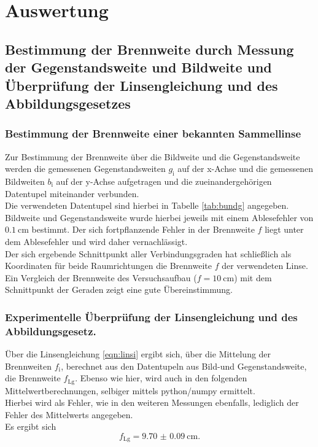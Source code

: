 \section{Auswertung}
\label{sec:Auswertung}

\subsection{Bestimmung der Brennweite durch Messung der Gegenstandsweite und Bildweite und Überprüfung der Linsengleichung und des Abbildungsgesetzes}

\subsubsection{Bestimmung der Brennweite einer bekannten Sammellinse}
\label{sec:zuvor}
Zur Bestimmung der Brennweite über die Bildweite und die Gegenstandsweite werden die gemessenen Gegenstandsweiten $g_{\mathrm{i}}$ auf der x-Achse und die gemessenen Bildweiten $b_{\mathrm{i}}$ auf der y-Achse aufgetragen und die zueinandergehörigen Datentupel miteinander verbunden. \\
Die verwendeten Datentupel sind hierbei in Tabelle \ref{tab:bundg} angegeben.
Bildweite und Gegenstandsweite wurde hierbei jeweils mit einem Ablesefehler von $\SI{0.1}{\centi\meter}$ bestimmt. Der sich fortpflanzende Fehler in der Brennweite $f$ liegt unter dem Ablesefehler und wird daher vernachlässigt.
\\Der sich ergebende Schnittpunkt aller Verbindungsgraden hat schließlich als Koordinaten für beide Raumrichtungen die Brennweite $f$ der verwendeten Linse.
Ein Vergleich der Brennweite des Versuchsaufbau ($f=\SI{10}{\centi\meter}$) mit dem Schnittpunkt der Geraden zeigt eine gute Übereinstimmung.

\subsubsection{Experimentelle Überprüfung der Linsengleichung und des Abbildungsgesetz.}
Über die Linsengleichung \eqref{eqn:linsi} ergibt sich, über die Mittelung der Brennweiten $f_{\mathrm{i}}$, berechnet aus den Datentupeln aus Bild-und Gegenstandsweite, die Brennweite $f_{\mathrm{Lg}}$.
Ebenso wie hier, wird auch in den folgenden Mittelwertberechnungen, selbiger mittels python/numpy \cite{numpy} ermittelt.\\
Hierbei wird als Fehler, wie in den weiteren Messungen ebenfalls, lediglich der Fehler des Mittelwerts angegeben.\\
Es ergibt sich
\begin{equation*}
  f_{\mathrm{Lg}}=\SI{9.70(9)}{\centi\meter}\text{.}
\end{equation*}

